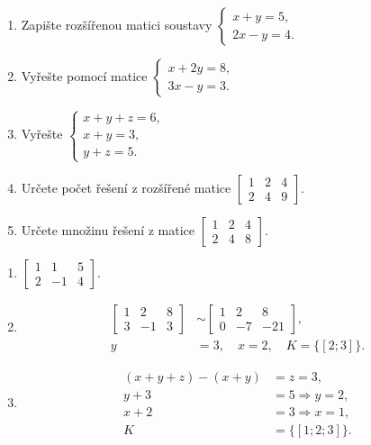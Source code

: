 \documentclass[11pt,a4paper]{article}
\begin{document}
\begin{zadaniReseniBox}[title={Domácí úkol}]
\begin{enumerate}[label=\alph*)]
\item Zapište rozšířenou matici soustavy $\begin{cases}x+y=5,\\2x-y=4.\end{cases}$
\item Vyřešte pomocí matice $\begin{cases}x+2y=8,\\3x-y=3.\end{cases}$
\item Vyřešte $\begin{cases}x+y+z=6,\\x+y=3,\\y+z=5.\end{cases}$
\item Určete počet řešení z rozšířené matice $\left[\begin{array}{cc|c}1&2&4\\2&4&9\end{array}\right]$.
\item Určete množinu řešení z matice $\left[\begin{array}{cc|c}1&2&4\\2&4&8\end{array}\right]$.
\end{enumerate}
\tcblower
\begin{enumerate}[label=\alph*)]
\item $\left[\begin{array}{cc|c}1&1&5\\2&-1&4\end{array}\right]$.
\item
\[\begin{aligned}
\left[\begin{array}{cc|c}1&2&8\\3&-1&3\end{array}\right]
&\sim\left[\begin{array}{cc|c}1&2&8\\0&-7&-21\end{array}\right],\\
y&=3,\quad x=2,\quad K=\{[2;3]\}.
\end{aligned}\]
\item
\[\begin{aligned}
(x+y+z)-(x+y)&=z=3,\\y+3&=5\Rightarrow y=2,\\x+2&=3\Rightarrow x=1,\\K&=\{[1;2;3]\}.

\end{aligned}\]
\end{enumerate}
\end{zadaniReseniBox}
\end{document}
